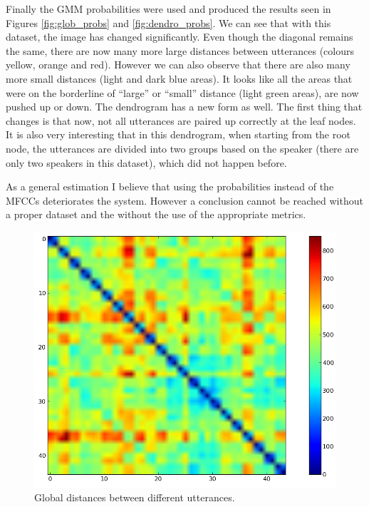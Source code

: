 \documentclass[12pt,a4paper,oneside]{article}
\begin{document}
Finally the GMM probabilities were used and produced the results seen in Figures \ref{fig:glob_probs} and \ref{fig:dendro_probs}. We can see that with this dataset, the image has changed significantly. Even though the diagonal remains the same, there are now many more large distances between utterances (colours yellow, orange and red). However we can also observe that there are also many more small distances (light and dark blue areas). It looks like all the areas that were on the borderline of ``large'' or ``small'' distance (light green areas), are now pushed up or down. The dendrogram has a new form as well. The first thing that changes is that now, not all utterances are paired up correctly at the leaf nodes. It is also very interesting that in this dendrogram, when starting from the root node, the utterances are divided into two groups based on the speaker (there are only two speakers in this dataset), which did not happen before.

As a general estimation I believe that using the probabilities instead of the MFCCs deteriorates the system. However a conclusion cannot be reached without a proper dataset and the without the use of the appropriate metrics.

\begin{figure}
\centering
\includegraphics[scale=0.5]{../global_distances_colorbar.png}
\caption{Global distances between different utterances.}
\label{fig:glob}
\end{figure}
\end{document}
